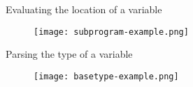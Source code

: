 
\begin{frame}{Evaluating the location of a variable}
	\begin{figure}
		\texttt{[image: subprogram-example.png]}
	\end{figure}
\end{frame}


\begin{frame}{Parsing the type of a variable}
	\begin{figure}
		\texttt{[image: basetype-example.png]}
	\end{figure}
\end{frame}



